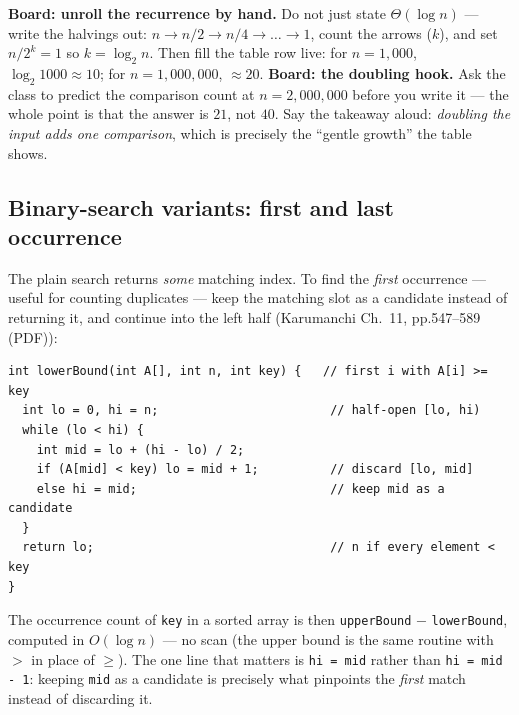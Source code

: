 \documentclass[11pt]{article}
\begin{document}

\textbf{Board: unroll the recurrence by hand.} Do not just state $\Theta(\log n)$ --- write the halvings out: $n \to n/2 \to n/4 \to \dots \to 1$, count the arrows ($k$), and set $n/2^{k} = 1$ so $k = \log_2 n$. Then fill the table row live: for $n = 1{,}000$, $\log_2 1000 \approx 10$; for $n = 1{,}000{,}000$, $\approx 20$. \textbf{Board: the doubling hook.} Ask the class to predict the comparison count at $n = 2{,}000{,}000$ before you write it --- the whole point is that the answer is $21$, not $40$. Say the takeaway aloud: \emph{doubling the input adds one comparison}, which is precisely the ``gentle growth'' the table shows.

\subsection{Binary-search variants: first and last occurrence}

The plain search returns \emph{some} matching index. To find the \emph{first} occurrence --- useful for counting duplicates --- keep the matching slot as a candidate instead of returning it, and continue into the left half (Karumanchi Ch.~11, pp.547--589 (PDF)):

{\footnotesize
\begin{verbatim}
int lowerBound(int A[], int n, int key) {   // first i with A[i] >= key
  int lo = 0, hi = n;                        // half-open [lo, hi)
  while (lo < hi) {
    int mid = lo + (hi - lo) / 2;
    if (A[mid] < key) lo = mid + 1;          // discard [lo, mid]
    else hi = mid;                           // keep mid as a candidate
  }
  return lo;                                 // n if every element < key
}
\end{verbatim}
}

The occurrence count of \texttt{key} in a sorted array is then \texttt{upperBound} $-$ \texttt{lowerBound}, computed in $O(\log n)$ --- no scan (the upper bound is the same routine with $>$ in place of $\ge$). The one line that matters is \texttt{hi = mid} rather than \texttt{hi = mid - 1}: keeping \texttt{mid} as a candidate is precisely what pinpoints the \emph{first} match instead of discarding it.
\end{document}
